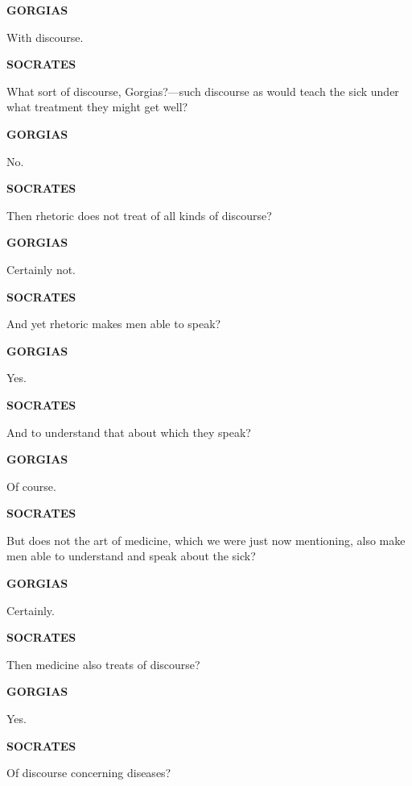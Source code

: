 \documentclass[11pt,letter]{article}
\begin{document}
\par \textbf{GORGIAS}
\par   With discourse.

\par \textbf{SOCRATES}
\par   What sort of discourse, Gorgias?—such discourse as would teach the sick under what treatment they might get well?

\par \textbf{GORGIAS}
\par   No.

\par \textbf{SOCRATES}
\par   Then rhetoric does not treat of all kinds of discourse?

\par \textbf{GORGIAS}
\par   Certainly not.

\par \textbf{SOCRATES}
\par   And yet rhetoric makes men able to speak?

\par \textbf{GORGIAS}
\par   Yes.

\par \textbf{SOCRATES}
\par   And to understand that about which they speak?

\par \textbf{GORGIAS}
\par   Of course.

\par \textbf{SOCRATES}
\par   But does not the art of medicine, which we were just now mentioning, also make men able to understand and speak about the sick?

\par \textbf{GORGIAS}
\par   Certainly.

\par \textbf{SOCRATES}
\par   Then medicine also treats of discourse?

\par \textbf{GORGIAS}
\par   Yes.

\par \textbf{SOCRATES}
\par   Of discourse concerning diseases?
\end{document}
